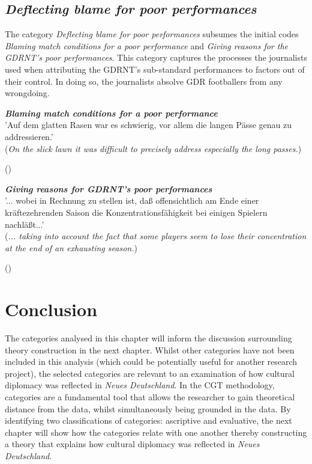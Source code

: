 \subsection*{\textit{Deflecting blame for poor performances}}

The category \textit{Deflecting blame for poor performances} subsumes the initial codes \textit{Blaming match conditions for a poor performance} and \textit{Giving reasons for the GDRNT’s poor performances}. This category captures the processes the journalists used when attributing the GDRNT’s sub-standard performances to factors out of their control. In doing so, the journalists absolve GDR footballers from any wrongdoing.

\begin{displayquote}
\begin{small}
\textbf{\textit{Blaming match conditions for a poor performance}}\\
'Auf dem glatten Rasen war es schwierig, vor allem die langen Pässe genau zu addressieren.'\\
(\textit{On the slick lawn it was difficult to precisely address especially the long passes.})\
\begin{flushright}\footnotesize (\cite{nd19740619})\end{flushright}
\end{small}
\end{displayquote}

\begin{displayquote}
\begin{small}
\textbf{\textit{Giving reasons for GDRNT’s poor performances}}\\
'... wobei in Rechnung zu stellen ist, daß offensichtlich am Ende einer kräftezehrenden Saison die Konzentrationsfähigkeit bei einigen Spielern nachläßt...'\\
(\textit{... taking into account the fact that some players seem to lose their concentration at the end of an exhausting season.})\
\begin{flushright}\footnotesize (\cite{nd19740328})\end{flushright}
\end{small}
\end{displayquote}

\section*{Conclusion}

The categories analysed in this chapter will inform the discussion surrounding theory construction in the next chapter. Whilst other categories have not been included in this analysis (which could be potentially useful for another research project), the selected categories are relevant to an examination of how cultural diplomacy was reflected in \textit{Neues Deutschland}. In the CGT methodology, categories are a fundamental tool that allows the researcher to gain theoretical distance from the data, whilst simultaneously being grounded in the data. By identifying two classifications of categories: ascriptive and evaluative, the next chapter will show how the categories relate with one another thereby constructing a theory that explains how cultural diplomacy was reflected in \textit{Neues Deutschland}. 